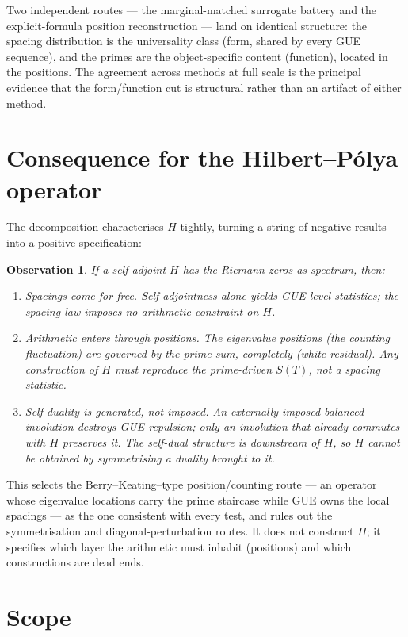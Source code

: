 \documentclass[11pt]{article}
\newtheorem{observation}{Observation}
\begin{document}
Two independent routes --- the marginal-matched surrogate battery and the explicit-formula position reconstruction --- land on identical structure: the spacing distribution is the universality class (form, shared by every GUE sequence), and the primes are the object-specific content (function), located in the positions. The agreement across methods at full scale is the principal evidence that the form/function cut is structural rather than an artifact of either method.

\section{Consequence for the Hilbert--P\'olya operator}

The decomposition characterises $H$ tightly, turning a string of negative results into a positive specification:

\begin{observation}
If a self-adjoint $H$ has the Riemann zeros as spectrum, then:
\begin{enumerate}\setlength\itemsep{2pt}
\item[(i)] \emph{Spacings come for free.} Self-adjointness alone yields GUE level statistics; the spacing law imposes no arithmetic constraint on $H$.
\item[(ii)] \emph{Arithmetic enters through positions.} The eigenvalue positions (the counting fluctuation) are governed by the prime sum, completely (white residual). Any construction of $H$ must reproduce the prime-driven $S(T)$, not a spacing statistic.
\item[(iii)] \emph{Self-duality is generated, not imposed.} An externally imposed balanced involution destroys GUE repulsion; only an involution that already commutes with $H$ preserves it. The self-dual structure is downstream of $H$, so $H$ cannot be obtained by symmetrising a duality brought to it.
\end{enumerate}
\end{observation}

This selects the Berry--Keating--type position/counting route --- an operator whose eigenvalue locations carry the prime staircase while GUE owns the local spacings --- as the one consistent with every test, and rules out the symmetrisation and diagonal-perturbation routes. It does not construct $H$; it specifies which layer the arithmetic must inhabit (positions) and which constructions are dead ends.

\section{Scope}
\end{document}
